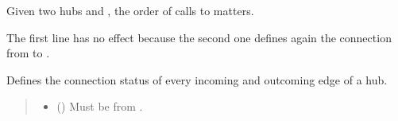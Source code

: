 \documentclass[letterpaper,10pt,english]{sphinxmanual}
\begin{document}
\begin{fulllineitems}
\begin{fulllineitems}
\sphinxAtStartPar
Given two hubs  and , the order of calls to  matters.

\begin{sphinxVerbatim}[commandchars=\\\{\}]
  
  
    
\end{sphinxVerbatim}

\sphinxAtStartPar
The first line has no effect because the second one defines again the connection from  to .

\end{fulllineitems}


\begin{fulllineitems}
\label{\detokenize{generated/tamos.network.ThermalNetwork:tamos.network.ThermalNetwork.set_node_status}}
\pysigstartsignatures
{}
\pysigstopsignatures
\sphinxAtStartPar
Defines the connection status of every incoming and outcoming edge of a hub.
\begin{quote}\begin{description}
\begin{itemize}
\item {} 
\sphinxAtStartPar
{} ({\hyperref[\detokenize{generated/tamos.Hub:tamos.Hub}]{}}) \textendash{} Must be from .


\end{itemize}
\end{description}
\end{quote}
\end{fulllineitems}
\end{fulllineitems}
\end{document}
